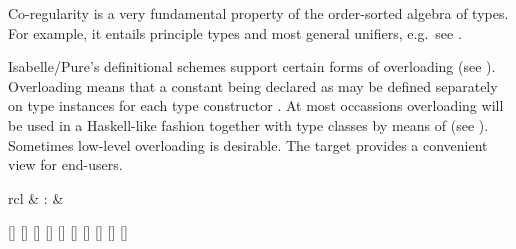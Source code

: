 \begin{isabellebody}
\begin{isamarkuptext}
  \medskip Co-regularity is a very fundamental property of the
  order-sorted algebra of types.  For example, it entails principle
  types and most general unifiers, e.g.\ see \cite{nipkow-prehofer}.%
\end{isamarkuptext}%
\isamarkuptrue%
%
\isamarkuptrue%
%
\begin{isamarkuptext}%
Isabelle/Pure's definitional schemes support certain forms of
  overloading (see ).  Overloading means that a
  constant being declared as  may be
  defined separately on type instances
  for each type constructor .  At most occassions
  overloading will be used in a Haskell-like fashion together with
  type classes by means of \hyperlink{command.instantiation}{\mbox{}} (see
  ).  Sometimes low-level overloading is desirable.
  The \hyperlink{command.overloading}{\mbox{}} target provides a convenient view for
  end-users.

  \begin{matharray}{rcl}
    \hypertarget{command.overloading}{\hyperlink{command.overloading}{\mbox{}}} & : &  \\
  \end{matharray}

  \begin{railoutput}
[]
\rail@plus
{}[]
\rail@endplus
{}[]
\rail@end
{}
[]
\rail@bar
{}[]
[]
\rail@endbar
{}[]
\rail@bar
{}
[]
[]
[]
\rail@endbar
\rail@end
\end{railoutput}



\end{isamarkuptext}
\end{isabellebody}
